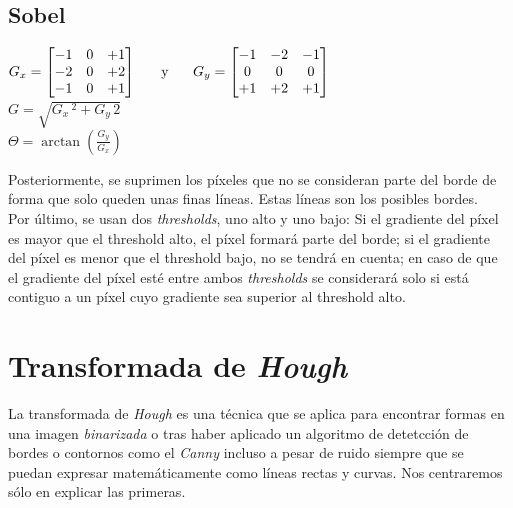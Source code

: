 \subsection{Sobel}
\begin{center}
  $ G_x = \begin{bmatrix}
    -1 & 0 & +1 \\
    -2 & 0 & +2 \\
    -1 & 0 & +1 \\
  \end{bmatrix}
  \hspace{0.5cm} \text{ y } \hspace{0.5cm} G_y = \begin{bmatrix}
    -1 & -2 & -1 \\
    0 & 0 & 0 \\
    +1 & +2 & +1 \\
  \end{bmatrix}
  $
  \\[0.5cm]
  $G = \sqrt{G_x\,^2 + G_y\,{2}}$
  \\[0.5cm]
  $\Theta= \arctan\left(\frac{G_y}{G_x} \right)$
\end{center}
Posteriormente, se suprimen los píxeles que no se consideran parte del
borde de forma que solo queden unas finas líneas. Estas líneas son los posibles bordes.\\
Por último, se usan dos \emph{thresholds}, uno alto y uno bajo: Si el
gradiente del píxel es mayor que el threshold alto, el píxel formará
parte del borde; si el gradiente del píxel es menor que el threshold
bajo, no se tendrá en cuenta; en caso de que el gradiente del píxel
esté entre ambos \emph{thresholds} se considerará solo si está
contiguo a un píxel cuyo gradiente sea superior al threshold alto.

\section{Transformada de \emph{Hough}}
La transformada de \emph{Hough} es una técnica que se aplica para
encontrar formas en una imagen \emph{binarizada} o tras haber aplicado
un algoritmo de detetcción de bordes o contornos como el \emph{Canny}
incluso a pesar de ruido siempre que se puedan expresar
matemáticamente como líneas rectas y curvas. Nos centraremos sólo en
explicar las primeras.
